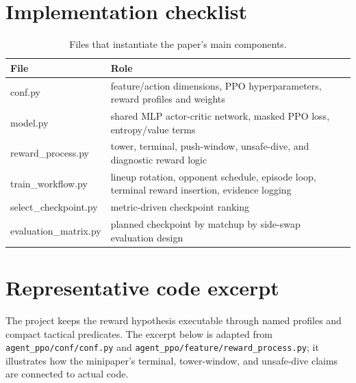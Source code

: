 \documentclass{article}
\begin{document}
\appendix
\section{Implementation checklist}

\begin{table}[h]
  \centering
  \caption{Files that instantiate the paper's main components.}
  \begin{tabularx}{\linewidth}{>{\ttfamily}p{3.2cm}X}
    \toprule
    File & Role \\
    \midrule
    conf.py & feature/action dimensions, PPO hyperparameters, reward profiles and weights \\
    model.py & shared MLP actor-critic network, masked PPO loss, entropy/value terms \\
    reward\_process.py & tower, terminal, push-window, unsafe-dive, and diagnostic reward logic \\
    train\_workflow.py & lineup rotation, opponent schedule, episode loop, terminal reward insertion, evidence logging \\
    select\_checkpoint.py & metric-driven checkpoint ranking \\
    evaluation\_matrix.py & planned checkpoint by matchup by side-swap evaluation design \\
    \bottomrule
  \end{tabularx}
\end{table}

\section{Representative code excerpt}

The project keeps the reward hypothesis executable through named profiles and compact tactical predicates. The excerpt below is adapted from \texttt{agent\_ppo/conf/conf.py} and \texttt{agent\_ppo/feature/reward\_process.py}; it illustrates how the minipaper's terminal, tower-window, and unsafe-dive claims are connected to actual code.
\end{document}
